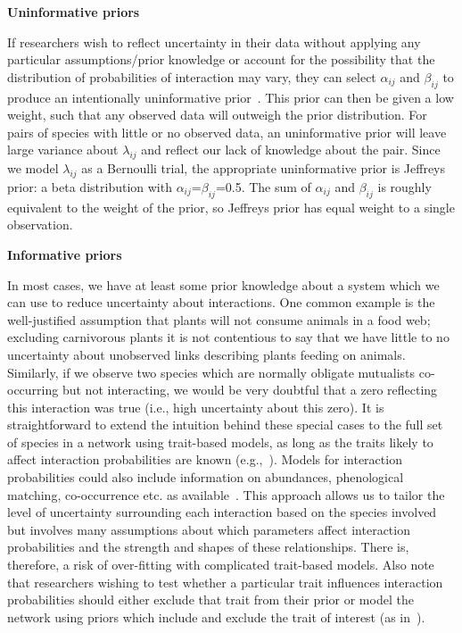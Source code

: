 \documentclass[12pt]{article}
\begin{document}
\begin{spacing}{2.0}
      \textbf{Uninformative priors}

        If researchers wish to reflect uncertainty in their data without applying any particular assumptions/prior knowledge or account for the possibility that the distribution of probabilities of interaction may vary, they can select $\alpha_{ij}$ and $\beta_{ij}$ to produce an intentionally uninformative prior~\citep{Leyland2005,Berger2006}. This prior can then be given a low weight, such that any observed data will outweigh the prior distribution. For pairs of species with little or no observed data, an uninformative prior will leave large variance about $\lambda_{ij}$ and reflect our lack of knowledge about the pair. Since we model $\lambda_{ij}$ as a Bernoulli trial, the appropriate uninformative prior is Jeffreys prior: a beta distribution with $\alpha_{ij}$=$\beta_{ij}$=0.5. The sum of $\alpha_{ij}$ and $\beta_{ij}$ is roughly equivalent to the weight of the prior, so Jeffreys prior has equal weight to a single observation. 


      \textbf{Informative priors}

        In most cases, we have at least some prior knowledge about a system which we can use to reduce uncertainty about interactions. One common example is the well-justified assumption that plants will not consume animals in a food web; excluding carnivorous plants it is not contentious to say that we have little to no uncertainty about unobserved links describing plants feeding on animals. Similarly, if we observe two species which are normally obligate mutualists co-occurring but not interacting, we would be very doubtful that a zero reflecting this interaction was true (i.e., high uncertainty about this zero). It is straightforward to extend the intuition behind these special cases to the full set of species in a network using trait-based models, as long as the traits likely to affect interaction probabilities are known (e.g.,~\citet{Riede2011,Gravel2013,Bartomeus2016,Weinstein2017}). Models for interaction probabilities could also include information on abundances, phenological matching, co-occurrence etc. as available~\citep{Jordano2016,Weinstein2017a,Graham2018}. This approach allows us to tailor the level of uncertainty surrounding each interaction based on the species involved but involves many assumptions about which parameters affect interaction probabilities and the strength and shapes of these relationships. There is, therefore, a risk of over-fitting with complicated trait-based models. Also note that researchers wishing to test whether a particular trait influences interaction probabilities should either exclude that trait from their prior or model the network using priors which include and exclude the trait of interest (as in~\citet{Weinstein2017,Weinstein2017a}).



\end{spacing}
\end{document}
